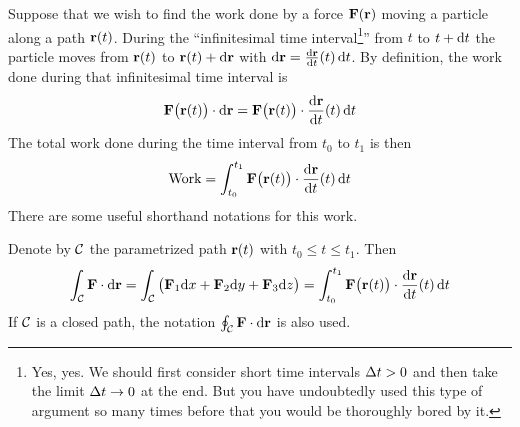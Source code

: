 Suppose that we wish to find the work done
by a force $\mathbf{F}(\mathbf{r})$ moving a particle 
along a path $\mathbf{r}(t)$. During the ``infinitesimal time interval\footnote{Yes, yes. We should first consider short time intervals $\Delta t>0$ and then take the limit 
$\Delta t\rightarrow 0$ at the end. But you have undoubtedly used this 
type of argument so many times before that you would be thoroughly 
bored by it.}'' 
from $t$ to $t+\mathrm{d}t$  the particle moves from $\mathbf{r}(t)$ to $\mathbf{r}(t)+\mathrm{d}\mathbf{r}$ with $\dee{\vr}=\diff{\vr}{t}(t)\,\dee{t}$. By definition, the work done 
during that infinitesimal time interval is 
\begin{equation*}
\vF\big(\vr(t)\big)\cdot\dee{\vr} = \vF\big(\vr(t)\big)\cdot
\diff{\vr}{t}(t)\,\dee{t}
\end{equation*}
The total work done during the time interval from $t_0$ to $t_1$ is then
\begin{equation*}
\text{Work} = \int_{t_0}^{t_1}\vF\big(\vr(t)\big)\cdot\diff{\vr}{t}(t)\,\dee{t}
\end{equation*}
There are some useful shorthand notations for this work.

\begin{notn}\label{not:workIntegral}
Denote by $\mathcal{C}$ the parametrized path $\mathbf{r}(t)$ with $t_0\le t\le t_1$. 
Then
\begin{equation*}
\int_\cC\vF\cdot\dee{\vr}
=\int_\cC\big(\vF_1\dee{x}+\vF_2\dee{y}+\vF_3\dee{z}\big)
=\int_{t_0}^{t_1}\vF\big(\vr(t)\big)\cdot\diff{\vr}{t}(t)\,\dee{t}
\end{equation*}
If $\mathcal{C}$ is a closed path, the notation $\oint_{\mathcal{C}}\mathbf{F}\cdot\mathrm{d}\mathbf{r}$
is also used.
\end{notn}

